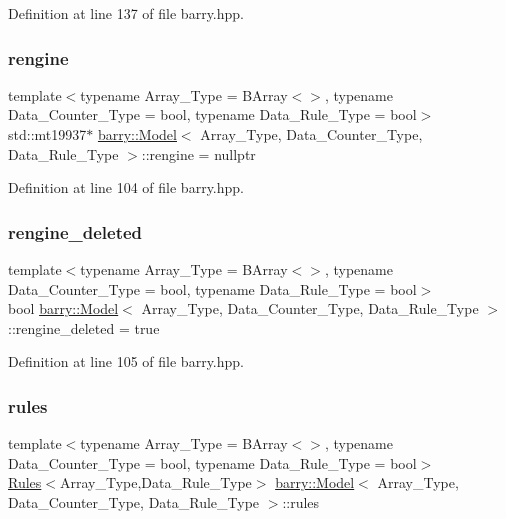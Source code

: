 Definition at line 137 of file barry.\+hpp.

\mbox{\label{classbarry_1_1_model_adc85f6765d272293333a83bc2a4e90d2}} 
\subsubsection{\texorpdfstring{rengine}{rengine}}
{\footnotesize\ttfamily template$<$typename Array\+\_\+\+Type  = B\+Array$<$$>$, typename Data\+\_\+\+Counter\+\_\+\+Type  = bool, typename Data\+\_\+\+Rule\+\_\+\+Type  = bool$>$ \\
std\+::mt19937$\ast$ \hyperlink{classbarry_1_1_model}{barry\+::\+Model}$<$ Array\+\_\+\+Type, Data\+\_\+\+Counter\+\_\+\+Type, Data\+\_\+\+Rule\+\_\+\+Type $>$\+::rengine = nullptr}



Definition at line 104 of file barry.\+hpp.

\mbox{\label{classbarry_1_1_model_afe239e83969b6b99eddf1ecd509bc8f2}} 
\subsubsection{\texorpdfstring{rengine\+\_\+deleted}{rengine\_deleted}}
{\footnotesize\ttfamily template$<$typename Array\+\_\+\+Type  = B\+Array$<$$>$, typename Data\+\_\+\+Counter\+\_\+\+Type  = bool, typename Data\+\_\+\+Rule\+\_\+\+Type  = bool$>$ \\
bool \hyperlink{classbarry_1_1_model}{barry\+::\+Model}$<$ Array\+\_\+\+Type, Data\+\_\+\+Counter\+\_\+\+Type, Data\+\_\+\+Rule\+\_\+\+Type $>$\+::rengine\+\_\+deleted = true}



Definition at line 105 of file barry.\+hpp.

\mbox{\label{classbarry_1_1_model_a53e5242ce0ed2bc7194a0662d09493f2}} 
\subsubsection{\texorpdfstring{rules}{rules}}
{\footnotesize\ttfamily template$<$typename Array\+\_\+\+Type  = B\+Array$<$$>$, typename Data\+\_\+\+Counter\+\_\+\+Type  = bool, typename Data\+\_\+\+Rule\+\_\+\+Type  = bool$>$ \\
\hyperlink{classbarry_1_1_rules}{Rules}$<$Array\+\_\+\+Type,Data\+\_\+\+Rule\+\_\+\+Type$>$ \hyperlink{classbarry_1_1_model}{barry\+::\+Model}$<$ Array\+\_\+\+Type, Data\+\_\+\+Counter\+\_\+\+Type, Data\+\_\+\+Rule\+\_\+\+Type $>$\+::rules}



